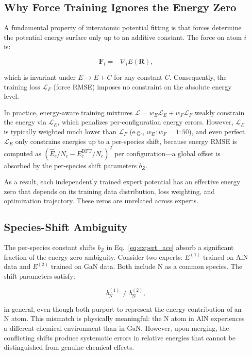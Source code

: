 \documentclass[twoside,prb,aps,floatfix,superscriptaddress,longbibliography]{revtex4-2}
\begin{document}
\subsection{Why Force Training Ignores the Energy Zero}

A fundamental property of interatomic potential fitting is that forces determine the potential energy surface only up to an additive constant. The force on atom $i$ is:

\begin{equation}
\mathbf{F}_i = -\nabla_i E(\mathbf{R}),
\label{eq:force_derivative}
\end{equation}

which is invariant under $E \to E + C$ for any constant $C$. Consequently, the training loss $\mathcal{L}_F$ (force RMSE) imposes no constraint on the absolute energy level.

In practice, energy-aware training mixtures $\mathcal{L} = w_E \mathcal{L}_E + w_F \mathcal{L}_F$ weakly constrain the energy via $\mathcal{L}_E$, which penalizes per-configuration energy errors. However, $\mathcal{L}_E$ is typically weighted much lower than $\mathcal{L}_F$ (e.g., $w_E : w_F = 1:50$), and even perfect $\mathcal{L}_E$ only constrains energies up to a per-species shift, because energy RMSE is computed as $(\hat{E}_c/N_c - E_c^{\mathrm{DFT}}/N_c)^2$ per configuration---a global offset is absorbed by the per-species shift parameters $b_Z$.

As a result, each independently trained expert potential has an effective energy zero that depends on its training data distribution, loss weighting, and optimization trajectory. These zeros are unrelated across experts.

\subsection{Species-Shift Ambiguity}

The per-species constant shifts $b_Z$ in Eq.~\eqref{eq:expert_ace} absorb a significant fraction of the energy-zero ambiguity. Consider two experts: $E^{(1)}$ trained on AlN data and $E^{(2)}$ trained on GaN data. Both include N as a common species. The shift parameters satisfy:

\begin{equation}
b_{\mathrm{N}}^{(1)} \neq b_{\mathrm{N}}^{(2)},
\label{eq:shift_mismatch}
\end{equation}

in general, even though both purport to represent the energy contribution of an N atom. This mismatch is physically meaningful: the N atom in AlN experiences a different chemical environment than in GaN. However, upon merging, the conflicting shifts produce systematic errors in relative energies that cannot be distinguished from genuine chemical effects.
\end{document}
